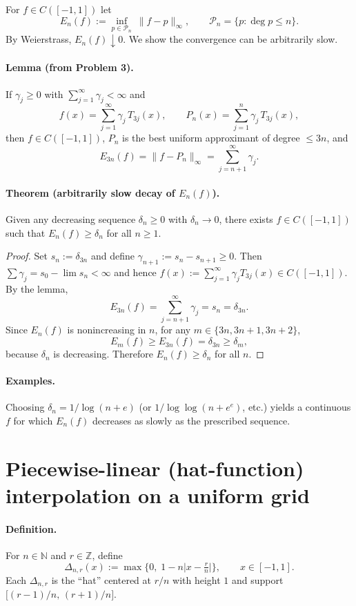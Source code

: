 \documentclass[11pt,a4paper]{article}
\theoremstyle{definition}
\theoremstyle{definition}
\theoremstyle{plain}
\theoremstyle{remark}
\begin{document}
For \(f\in C([-1,1])\) let
\[
E_n(f):=\inf_{p\in\mathcal P_n}\ \|f-p\|_\infty,\qquad
\mathcal P_n=\{p:\deg p\le n\}.
\]
By Weierstrass, \(E_n(f)\downarrow 0\). We show the convergence can be arbitrarily slow.

\paragraph{Lemma (from Problem 3).}
If \(\gamma_j\ge0\) with \(\sum_{j=1}^\infty\gamma_j<\infty\) and
\[
f(x)=\sum_{j=1}^\infty \gamma_j\,T_{3j}(x),\qquad
P_n(x)=\sum_{j=1}^{n}\gamma_j\,T_{3j}(x),
\]
then \(f\in C([-1,1])\), \(P_n\) is the best uniform approximant of degree \(\le 3n\), and
\[
E_{3n}(f)=\|f-P_n\|_\infty=\sum_{j=n+1}^\infty \gamma_j.
\]

\paragraph{Theorem (arbitrarily slow decay of \(E_n(f)\)).}
Given any decreasing sequence \(\delta_n\ge0\) with \(\delta_n\to 0\), there exists
\(f\in C([-1,1])\) such that \(E_n(f)\ge \delta_n\) for all \(n\ge1\).

\begin{proof}
	Set \(s_n:=\delta_{3n}\) and define \(\gamma_{n+1}:=s_n-s_{n+1}\ge0\).
	Then \(\sum \gamma_j=s_0-\lim s_n<\infty\) and hence
	\(f(x):=\sum_{j=1}^\infty \gamma_j T_{3j}(x)\in C([-1,1])\).
	By the lemma,
	\[
	E_{3n}(f)=\sum_{j=n+1}^\infty\gamma_j=s_n=\delta_{3n}.
	\]
	Since \(E_n(f)\) is nonincreasing in \(n\), for any \(m\in\{3n,3n+1,3n+2\}\),
	\[
	E_m(f)\ge E_{3n}(f)=\delta_{3n}\ge \delta_m,
	\]
	because \(\delta_n\) is decreasing. Therefore \(E_n(f)\ge \delta_n\) for all \(n\).
\end{proof}

\paragraph{Examples.}
Choosing \(\delta_n=1/\log(n+e)\) (or \(1/\log\log(n+e^e)\), etc.) yields a continuous \(f\)
for which \(E_n(f)\) decreases as slowly as the prescribed sequence.

\section*{Piecewise-linear (hat-function) interpolation on a uniform grid}

\paragraph{Definition.}
For $n\in\mathbb N$ and $r\in\mathbb Z$, define
\[
\Delta_{n,r}(x):=\max\!\Big\{0,\; 1-n\bigl|x-\tfrac{r}{n}\bigr|\Big\},\qquad x\in[-1,1].
\]
Each $\Delta_{n,r}$ is the “hat” centered at $r/n$ with height $1$ and support
$\big[(r-1)/n,\,(r+1)/n\big]$.
\end{document}

